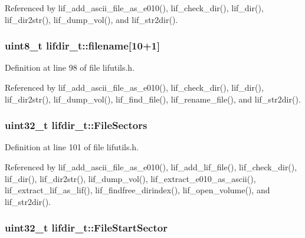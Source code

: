 Referenced by lif\+\_\+add\+\_\+ascii\+\_\+file\+\_\+as\+\_\+e010(), lif\+\_\+check\+\_\+dir(), lif\+\_\+dir(), lif\+\_\+dir2str(), lif\+\_\+dump\+\_\+vol(), and lif\+\_\+str2dir().

\subsubsection[{\texorpdfstring{filename}{filename}}]{\setlength{\rightskip}{0pt plus 5cm}uint8\+\_\+t lifdir\+\_\+t\+::filename\mbox{[}10+1\mbox{]}}\hypertarget{structlifdir__t_a700fd2eb77539353ba670b76d9acb29d}{}\label{structlifdir__t_a700fd2eb77539353ba670b76d9acb29d}


Definition at line 98 of file lifutils.\+h.



Referenced by lif\+\_\+add\+\_\+ascii\+\_\+file\+\_\+as\+\_\+e010(), lif\+\_\+check\+\_\+dir(), lif\+\_\+dir(), lif\+\_\+dir2str(), lif\+\_\+dump\+\_\+vol(), lif\+\_\+find\+\_\+file(), lif\+\_\+rename\+\_\+file(), and lif\+\_\+str2dir().

\subsubsection[{\texorpdfstring{File\+Sectors}{FileSectors}}]{\setlength{\rightskip}{0pt plus 5cm}uint32\+\_\+t lifdir\+\_\+t\+::\+File\+Sectors}\hypertarget{structlifdir__t_a92382e062294ebdc632c6c78dcd397aa}{}\label{structlifdir__t_a92382e062294ebdc632c6c78dcd397aa}


Definition at line 101 of file lifutils.\+h.



Referenced by lif\+\_\+add\+\_\+ascii\+\_\+file\+\_\+as\+\_\+e010(), lif\+\_\+add\+\_\+lif\+\_\+file(), lif\+\_\+check\+\_\+dir(), lif\+\_\+dir(), lif\+\_\+dir2str(), lif\+\_\+dump\+\_\+vol(), lif\+\_\+extract\+\_\+e010\+\_\+as\+\_\+ascii(), lif\+\_\+extract\+\_\+lif\+\_\+as\+\_\+lif(), lif\+\_\+findfree\+\_\+dirindex(), lif\+\_\+open\+\_\+volume(), and lif\+\_\+str2dir().

\subsubsection[{\texorpdfstring{File\+Start\+Sector}{FileStartSector}}]{\setlength{\rightskip}{0pt plus 5cm}uint32\+\_\+t lifdir\+\_\+t\+::\+File\+Start\+Sector}\hypertarget{structlifdir__t_ac17bb6f653b05078f5fc8112c21286f2}{}\label{structlifdir__t_ac17bb6f653b05078f5fc8112c21286f2}



